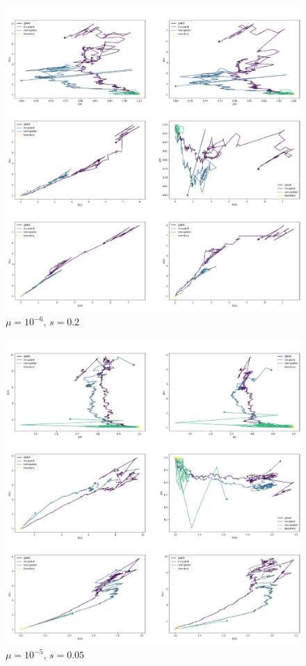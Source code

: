 \begin{figure}[h]
\centering
\includegraphics[width=\textwidth]{Chapter_3/figures/1e0602new.pdf}
\caption{$\mu=10^{-6}$, $s=0.2$}
\label{fig:1e0602new}
\end{figure}

\begin{figure}[h]
\centering
\includegraphics[width=\textwidth]{Chapter_3/figures/1e05005new.pdf}
\caption{$\mu=10^{-5}$, $s=0.05$}
\label{fig:1e05005new}
\end{figure}

